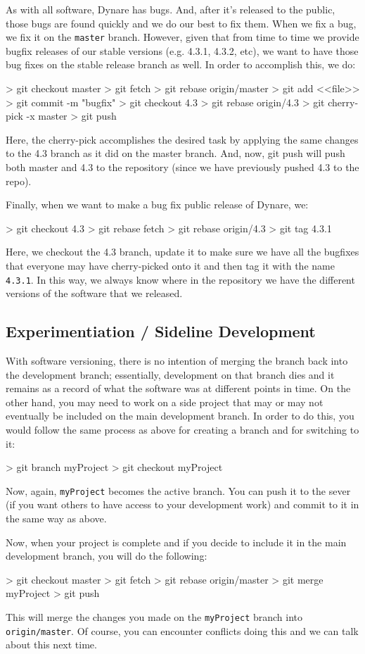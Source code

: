 \documentclass[10pt,letterpaper]{article}
\begin{document}
As with all software, Dynare has bugs. And, after it's released to the public, those bugs are found quickly and we do our best to fix them. When we fix a bug, we fix it on the \texttt{master} branch. However, given that from time to time we provide bugfix releases of our stable versions (e.g. 4.3.1, 4.3.2, etc), we want to have those bug fixes on the stable release branch as well. In order to accomplish this, we do:

\begin{code}
> git checkout master
> git fetch
> git rebase origin/master
> git add <<file>>
> git commit -m "bugfix"
> git checkout 4.3
> git rebase origin/4.3
> git cherry-pick -x master
> git push
\end{code}
\noindent Here, the cherry-pick accomplishes the desired task by applying the same changes to the 4.3 branch as it did on the master branch. And, now, git push will push both master and 4.3 to the repository (since we have previously pushed 4.3 to the repo).

Finally, when we want to make a bug fix public release of Dynare, we:
\begin{code}
> git checkout 4.3
> git rebase fetch
> git rebase origin/4.3
> git tag 4.3.1
\end{code}
\noindent Here, we checkout the 4.3 branch, update it to make sure we have all the bugfixes that everyone may have cherry-picked onto it and then tag it with the name \texttt{4.3.1}. In this way, we always know where in the repository we have the different versions of the software that we released.

\subsection{Experimentiation / Sideline Development}

With software versioning, there is no intention of merging the branch back into the development branch; essentially, development on that branch dies and it remains as a record of what the software was at different points in time. On the other hand, you may need to work on a side project that may or may not eventually be included on the main development branch. In order to do this, you would follow the same process as above for creating a branch and for switching to it:

\begin{code}
> git branch myProject
> git checkout myProject
\end{code}
\noindent Now, again, \texttt{myProject} becomes the active branch. You can push it to the sever (if you want others to have access to your development work) and commit to it in the same way as above.

Now, when your project is complete and if you decide to include it in the main development branch, you will do the following:
\begin{code}
> git checkout master
> git fetch
> git rebase origin/master
> git merge myProject
> git push
\end{code}
\noindent This will merge the changes you made on the \texttt{myProject} branch into \texttt{origin/master}. Of course, you can encounter conflicts doing this and we can talk about this next time.
\end{document}
